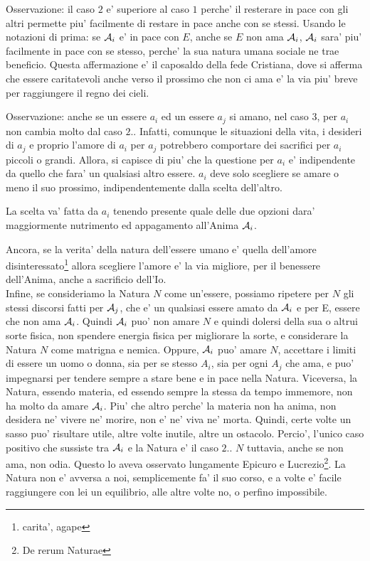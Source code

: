 Osservazione: il caso $2$ e' superiore al caso $1$ perche' il resterare in pace con gli altri permette piu' facilmente di restare in pace anche con se stessi. Usando le notazioni di prima: se $\mathcal{A}_i$ e' in pace con $E$, anche se $E$ non ama $\mathcal{A}_i$, $\mathcal{A}_i$ sara' piu' facilmente in pace con se stesso, perche' la sua natura umana sociale ne trae beneficio.
Questa affermazione e' il caposaldo della fede Cristiana, dove si afferma che essere caritatevoli anche verso il prossimo che non ci ama e' la via piu' breve per raggiungere il regno dei cieli.

Osservazione: anche se un essere $a_i$ ed un essere $a_j$ si amano, nel caso $3$, per $a_i$ non cambia molto dal caso $2.$. Infatti, comunque le situazioni della vita, i desideri di $a_j$ e proprio l'amore di $a_i$ per $a_j$ potrebbero comportare dei sacrifici per $a_i$ piccoli o grandi. Allora, si capisce di piu' che la questione per $a_i$ e' indipendente da quello che fara' un qualsiasi altro essere. $a_i$ deve solo scegliere se amare o meno il suo prossimo, indipendentemente dalla scelta dell'altro.

La scelta va' fatta da $a_i$ tenendo presente quale delle due opzioni dara' maggiormente nutrimento ed appagamento all'Anima $\mathcal{A}_i$. 

Ancora, se la verita' della natura dell'essere umano e' quella dell'amore disinteressato\footnote{carita', agape} allora scegliere l'amore e' la via migliore, per il benessere dell'Anima, anche a sacrificio dell'Io. \\

Infine, se consideriamo la Natura $N$ come un'essere, possiamo ripetere per $N$ gli stessi discorsi fatti per $\mathcal{A}_j$, che e' un qualsiasi essere amato da $\mathcal{A}_i$ e per E, essere che non ama $\mathcal{A}_i$. Quindi $\mathcal{A}_i$ puo' non amare $N$ e quindi dolersi della sua o altrui sorte fisica, non spendere energia fisica per migliorare la sorte, e considerare la Natura $N$ come matrigna e nemica. Oppure, $\mathcal{A}_i$ puo' amare $N$, accettare i limiti di essere un uomo o donna, sia per se stesso $A_i$, sia per ogni $A_j$ che ama, e puo' impegnarsi per tendere sempre a stare bene e in pace nella Natura. Viceversa, la Natura, essendo materia, ed essendo sempre la stessa da tempo immemore, non ha molto da amare $\mathcal{A}_i$. Piu' che altro perche' la materia non ha anima, non desidera ne' vivere ne' morire, non e' ne' viva ne' morta. Quindi, certe volte un sasso puo' risultare utile, altre volte inutile, altre un ostacolo. Percio', l'unico caso positivo che sussiste tra $\mathcal{A}_i$ e la Natura e' il caso $2.$. $N$ tuttavia, anche se non ama, non odia. Questo lo aveva osservato lungamente Epicuro e Lucrezio\footnote{De rerum Naturae}. La Natura non e' avversa a noi, semplicemente fa' il suo corso, e a volte e' facile raggiungere con lei un equilibrio, alle altre volte no, o perfino impossibile. \\

